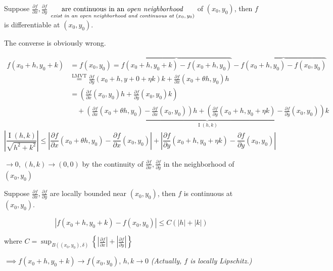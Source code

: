 \begin{proposition}
    Suppose $\frac{\partial f}{\partial x},\frac{\partial f}{\partial y}$ $\underset{\text{\emph{exist in an open neighborhood and continuous at $(x_0,y_0)$}}}{\text{are continuous in an \emph{open neighborhood}}}$ of $(x_0,y_0)$, then $f$ is differentiable at $(x_0,y_0)$.
    \begin{remark}
        The converse is obviously wrong.
    \end{remark}
    \begin{pf}
        \begin{align*}
            f(x_0+h,y_0+k) & =f(x_0,y_0)=\overbrace{f(x_0+h,y_0+k)-f(x_0+h,y_0)}-\overbrace{f(x_0+h,y_0)-f(x_0,y_0)}                                                                                                                                        \\
                           & \overset{\text{LMVT}}{=}\frac{\partial f}{\partial y}(x_0+h,y+0+\eta k)k+\frac{\partial f}{\partial x}(x_0+\theta h,y_0)h                                                                                                      \\
                           & =(\frac{\partial f}{\partial x}(x_0,y_0)h+\frac{\partial f}{\partial y}(x_0,y_0)k)                                                                                                                                             \\
                           & \quad+\underbrace{(\frac{\partial f}{\partial x}(x_0+\theta h,y_0)-\frac{\partial f}{\partial x}(x_0,y_0))h+(\frac{\partial f}{\partial y}(x_0+h,y_0+\eta k)-\frac{\partial f}{\partial y}(x_0,y_0))k}_{\operatorname{I}(h,k)}
        \end{align*}
        $$\left|\frac{\operatorname{I}(h,k)}{\sqrt{h^2+k^2}}\right|\leq\left|\frac{\partial f}{\partial x}(x_0+\theta h,y_0)-\frac{\partial f}{\partial x}(x_0,y_0)\right|+\left|\frac{\partial f}{\partial y}(x_0+h,y_0+\eta k)-\frac{\partial f}{\partial y}(x_0,y_0)\right|$$

        $\to0$, $(h,k)\to(0,0)$ by the continuity of $\frac{\partial f}{\partial x},\frac{\partial f}{\partial y}$ in the neighborhood of $(x_0,y_0)$
    \end{pf}
\end{proposition}

\begin{proposition}
    Suppose $\frac{\partial f}{\partial x},\frac{\partial f}{\partial y}$ are locally bounded near $(x_0,y_0)$, then $f$ is continuous at $(x_0,y_0)$.
    \begin{pf}
        $$\left|f(x_0+h,y_0+k)-f(x_0,y_0)\right|\leq C(|h|+|k|)$$

        where $C=\sup_{B((x_0,y_0),\delta)}\left\{\left|\frac{\partial f}{\partial x}\right|+\left|\frac{\partial f}{\partial y}\right|\right\}$

        $\implies f(x_0+h,y_0+k)\to f(x_0,y_0)$, $h,k\to0$ \emph{(Actually, $f$ is locally Lipschitz.)}
    \end{pf}
\end{proposition}

